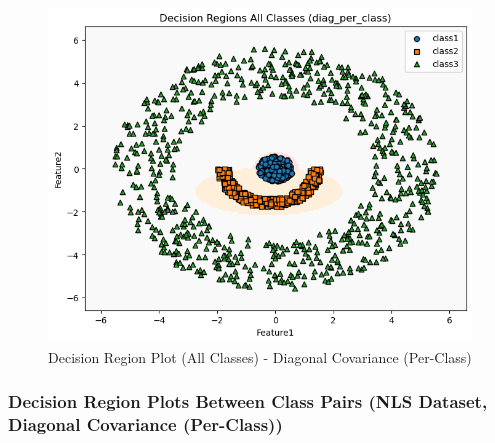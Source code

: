 \begin{figure}[H]
    \centering
    \includegraphics[width=\linewidth]{images/NLS_Group04_images/03_diag_per_class/05_decision_region_all.png}
    \caption{Decision Region Plot (All Classes) - Diagonal Covariance (Per-Class)}
\end{figure}

\subsubsection{Decision Region Plots Between Class Pairs (NLS Dataset, Diagonal Covariance (Per-Class))}

